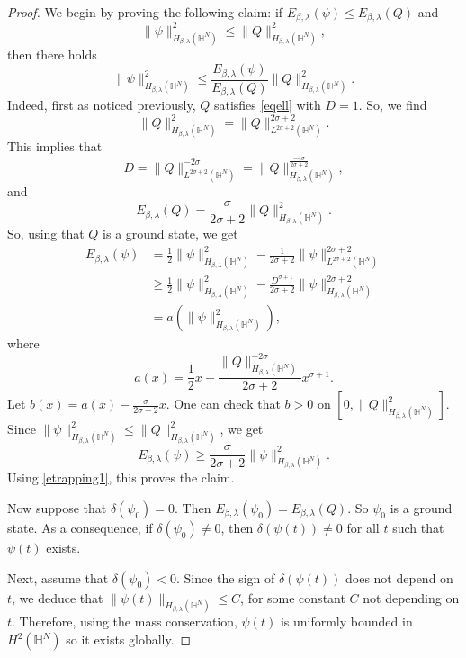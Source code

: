 \documentclass[10pt,leqno]{amsart}
\numberwithin{equation}{section}
\newcommand{\field}[1]{\mathbb{#1}}
\newcommand{\Hy}{\field{H}}
\begin{document}
\begin{proof}
We begin by proving the following claim: if $E_{\beta,\lambda} (\psi)\leq E_{\beta,\lambda} (Q)$ and 
\[
\|\psi\|_{H_{\beta,\lambda} (\Hy^N)}^2  \leq \|Q\|_{H_{\beta,\lambda} (\Hy^N)}^2,
\] 
then there holds
$$\|\psi\|_{H_{\beta,\lambda} (\Hy^N)}^2  \leq \dfrac{E_{\beta,\lambda} (\psi)}{E_{\beta,\lambda} (Q)}\|Q\|_{H_{\beta,\lambda} (\Hy^N)}^2 .$$
Indeed, first as noticed previously, $Q$ satisfies \eqref{eqell} with $D=1$. So, we find 
$$\|Q\|_{H_{\beta,\lambda} (\Hy^N)}^2 =\|Q\|_{L^{2\sigma +2} (\Hy^N)}^{2\sigma +2}.$$
This implies that
$$D=\|Q\|_{L^{2\sigma+2} (\Hy^N)}^{-2\sigma}=\|Q\|_{H_{\beta,\lambda} (\Hy^N)}^{\frac{-4\sigma}{2\sigma +2}} ,$$
and
\begin{equation}
\label{etrapping1}
E_{\beta,\lambda} (Q)= \frac{\sigma}{2\sigma +2}\|Q\|_{H_{\beta,\lambda} (\Hy^N)}^2 .
\end{equation}
So, using that $Q$ is a ground state, we get 
\begin{align*}
E_{\beta,\lambda} (\psi)&= \frac{1}{2}\|\psi\|_{H_{\beta,\lambda} (\Hy^N)}^2 - \frac{1}{2\sigma +2} \|\psi\|_{L^{2\sigma +2}(\Hy^N)}^{2\sigma +2}\\
& \geq  \frac{1}{2}\|\psi\|_{H_{\beta,\lambda} (\Hy^N)}^2 - \frac{D^{\sigma +1}}{2\sigma +2} \|\psi\|_{H_{\beta,\lambda} (\Hy^N)}^{2\sigma +2}\\
&= a (\|\psi\|_{H_{\beta,\lambda} (\Hy^N)}^2),
\end{align*}
where
$$a(x)=\dfrac{1}{2}x - \dfrac{\|Q\|_{H_{\beta,\lambda} (\Hy^N)}^{-2\sigma}}{2\sigma +2} x^{\sigma +1}.$$
Let $b(x)=a(x) - \frac{\sigma}{2\sigma +2} x$. One can check that $b>0$ on $[0,\|Q\|_{H_{\beta,\lambda} (\Hy^N)}^2]$. Since $\|\psi\|_{H_{\beta,\lambda} (\Hy^N)}^2 \leq \|Q\|_{H_{\beta,\lambda} (\Hy^N)}^2$, we get
$$E_{\beta,\lambda}(\psi)\geq \dfrac{\sigma}{2\sigma +2}\|\psi\|_{H_{\beta,\lambda} (\Hy^N)}^2.$$
Using \eqref{etrapping1}, this proves the claim.

Now suppose that $\delta (\psi_0)=0$. Then $E_{\beta,\lambda}(\psi_0)=E_{\beta,\lambda}(Q)$. So $\psi_0$ is a ground state. As a consequence, if $\delta (\psi_0)\neq 0$, then $\delta (\psi(t))\neq 0$ for all $t$ such that $\psi(t)$ exists.

Next, assume that $\delta (\psi_0)<0$. Since the sign of $\delta (\psi(t))$ does not depend on $t$, we deduce that $\|\psi(t)\|_{H_{\beta,\lambda} (\Hy^N)}\leq C$, for some constant $C$ not depending on $t$. Therefore, using the mass conservation, $\psi(t)$ is uniformly bounded in $H^2 (\Hy^N)$ so it exists globally.


\end{proof}
\end{document}
